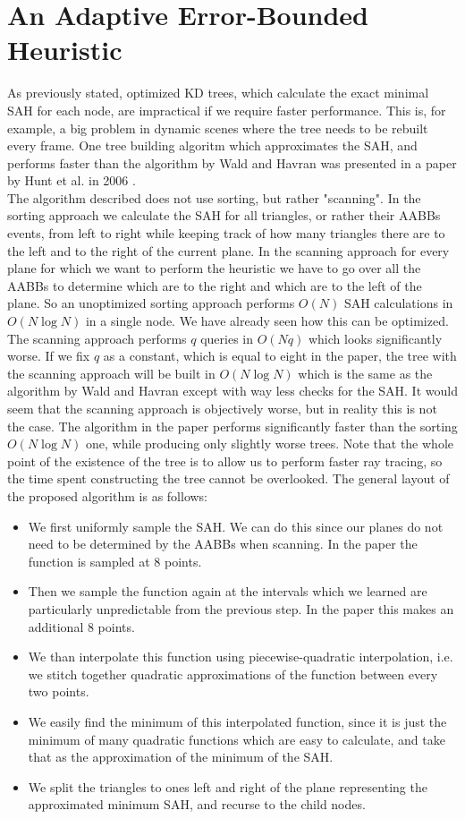 \documentclass[12pt]{article}
\begin{document}
\section{An Adaptive Error-Bounded Heuristic}
As previously stated, optimized KD trees, which calculate the exact minimal SAH for each node, are impractical if we require faster performance. This is, for example, a big problem in dynamic scenes where the tree needs to be rebuilt every frame. One tree building algoritm which approximates the SAH, and performs faster than the algorithm by Wald and Havran \cite{wald2006building} was presented in a paper by Hunt et al. in 2006 \cite{hunt2006fast}.\\
\indent The algorithm described does not use sorting, but rather "scanning". In the sorting approach we calculate the SAH for all triangles, or rather their AABBs events, from left to right while keeping track of how many triangles there are to the left and to the right of the current plane. In the scanning approach for every plane for which we want to perform the heuristic we have to go over all the AABBs to determine which are to the right and which are to the left of the plane. So an unoptimized sorting approach performs $O(N)$ SAH calculations in $O(N \log N)$ in a single node. We have already seen how this can be optimized. The scanning approach performs $q$ queries in $O(Nq)$ which looks significantly worse. If we fix $q$ as a constant, which is equal to eight in the paper, the tree with the scanning approach will be built in $O(N\log N)$ which is the same as the algorithm by Wald and Havran \cite{wald2006building} except with way less checks for the SAH. It would seem that the scanning approach is objectively worse, but in reality this is not the case. The algorithm in the paper performs significantly faster than the sorting $O(N\log N)$ one, while producing only slightly worse trees. Note that the whole point of the existence of the tree is to allow us to perform faster ray tracing, so the time spent constructing the tree cannot be overlooked. The general layout of the proposed algorithm is as follows:
\begin{itemize}
\item We first uniformly sample the SAH. We can do this since our planes do not need to be determined by the AABBs when scanning. In the paper the function is sampled at 8 points.
\item Then we sample the function again at the intervals which we learned are particularly unpredictable from the previous step. In the paper this makes an additional 8 points.
\item We than interpolate this function using piecewise-quadratic interpolation, i.e. we stitch together quadratic approximations of the function between every two points.
\item We easily find the minimum of this interpolated function, since it is just the minimum of many quadratic functions which are easy to calculate, and take that as the approximation of the minimum of the SAH.
\item We split the triangles to ones left and right of the plane representing the approximated minimum SAH, and recurse to the child nodes.
\end{itemize}
\end{document}
